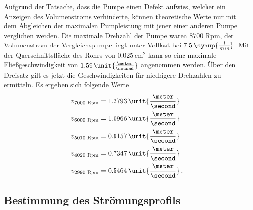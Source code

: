 Aufgrund der Tatsache, dass die Pumpe einen Defekt aufwies, welcher ein Anzeigen des Volumenstroms verhinderte, können theoretische Werte nur mit dem Abgleichen der maximalen Pumpleistung mit jener einer anderen Pumpe verglichen werden.
Die maximale Drehzahl der Pumpe waren $8700$ Rpm, der Volumenstrom der Vergleichspumpe liegt unter Volllast bei $7.5 \,\symup{\frac{l}{min}}$. Mit der Querschnittsfläche des Rohrs von $0.025\, \unit{\centi \meter}^2$ kann so eine maximale Fließgeschwindigkeit von
$1.59 \, \unit{\frac{\meter}{\second}}$ angenommen werden.
Über den Dreisatz gilt es jetzt die Geschwindigkeiten für niedrigere Drehzahlen zu ermitteln.
Es ergeben sich folgende Werte 
\begin{align*}
     v_{7000\text{ Rpm}}&=1.2793\, \unit{\frac{\meter}{\second}}\\
     v_{6000\text{ Rpm}}&=1.0966\, \unit{\frac{\meter}{\second}}\\
     v_{5010\text{ Rpm}}&=0.9157\, \unit{\frac{\meter}{\second}}\\
     v_{4020\text{ Rpm}}&=0.7347\, \unit{\frac{\meter}{\second}}\\
     v_{2990\text{ Rpm}}&=0.5464\, \unit{\frac{\meter}{\second}}\, .\\
\end{align*}
\subsection{Bestimmung des Strömungsprofils}  
\label{sec:Profil}

